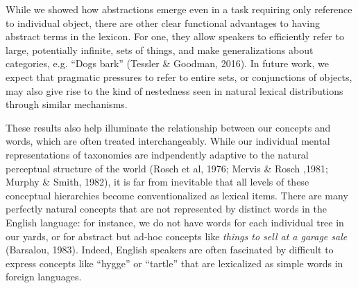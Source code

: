 \documentclass[10pt,letterpaper]{article}
\begin{document}
While we showed how abstractions emerge even in a task requiring only reference to individual object, there are other clear functional advantages to having abstract terms in the lexicon. For one, they allow speakers to efficiently refer to large, potentially infinite, sets of things, and make generalizations about categories, e.g. ``Dogs bark'' (Tessler \& Goodman, 2016). In future work, we expect that pragmatic pressures to refer to entire sets, or conjunctions of objects, may also give rise to the kind of nestedness seen in natural lexical distributions through similar mechanisms.

These results also help illuminate the relationship between our concepts and words, which are often treated interchangeably. While our individual mental representations of taxonomies are indpendently adaptive to the natural perceptual structure of the world (Rosch et al, 1976; Mervis \& Rosch ,1981; Murphy \& Smith, 1982), it is far from inevitable that all levels of these conceptual hierarchies become conventionalized as lexical items. There are many perfectly natural concepts that are not represented by distinct words in the English language: for instance, we do not have words for each individual tree in our yards, or for abstract but ad-hoc concepts like \emph{things to sell at a garage sale} (Barsalou, 1983). Indeed, English speakers are often fascinated by difficult to express concepts like ``hygge'' or ``tartle'' that are lexicalized as simple words in foreign languages.


\end{document}
